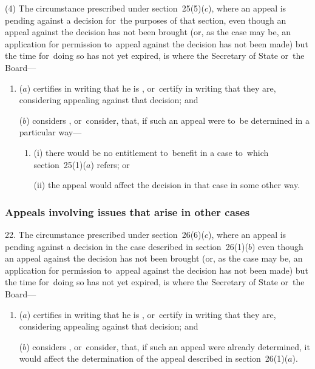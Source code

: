 \documentclass[12pt,a4paper]{article}
\begin{document}
(4) The circumstance prescribed under section~25(5)($c$), where an appeal is pending against a decision for~the purposes of that section, even though an appeal against the decision has not been brought (or, as the case may be, an application for 
permission  %
to~appeal against the decision has not been made) but the time for~doing so has not yet expired, is where the Secretary of State
or~the Board—  %
\begin{enumerate}\item[]
($a$) certifies in writing that he is%
, or~certify in writing that they are,  %
considering appealing against that decision; and

($b$) considers%
, or~consider,  %
that, if such an appeal were to~be determined in a particular way—
\begin{enumerate}\item[]
(i) there would be no entitlement to~benefit in a case to~which section~25(1)($a$) refers; or

(ii) the appeal would affect the decision in that case in some other way.
\end{enumerate}
\end{enumerate}


\subsubsection[22. Appeals involving issues that arise in other cases]{Appeals involving issues that arise in other cases}

22.  The circumstance prescribed under section~26(6)($c$), where an appeal is pending against a decision in the case described in section~26(1)($b$) even though an appeal against the decision has not been brought (or, as the case may be, an application for 
permission  %
to~appeal against the decision has not been made) but the time for~doing so has not yet expired, is where the Secretary of State
or~the Board—  %
\begin{enumerate}\item[]
($a$) certifies in writing that he is%
, or~certify in writing that they are,  %
considering appealing against that decision; and

($b$) considers%
, or~consider,  %
that, if such an appeal were already determined, it would affect the determination of the appeal described in section~26(1)($a$).
\end{enumerate}
\end{document}
